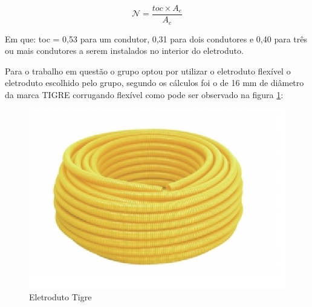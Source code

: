 \begin{equation}
	\mathcal{N} = \frac{{toc \times A_e}}{A_c}
\end{equation}

Em que: toc = 0,53 para um condutor, 0,31 para dois condutores e 0,40 para três ou mais condutores a serem instalados no interior do eletroduto.

Para o trabalho em questão o grupo optou por utilizar o eletroduto flexível o eletroduto escolhido pelo grupo, segundo os cálculos foi o de 16 mm de diâmetro da marca TIGRE corrugando flexível como pode ser observado na figura \ref{eltroduto-tigre}:

\begin{figure}
	\centering
	\includegraphics[scale=0.8]{figuras/tigre.png}
	\caption{Eletroduto Tigre}
	\label{eltroduto-tigre}
\end{figure}
